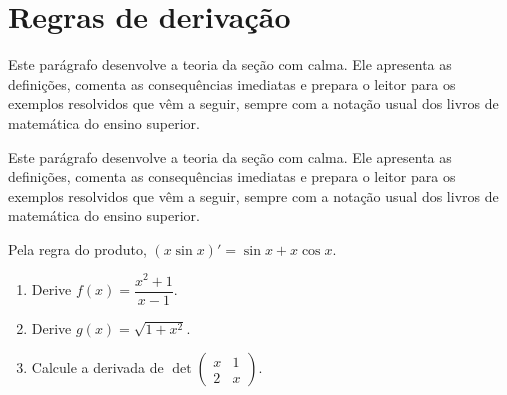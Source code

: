 \documentclass[11pt,oneside]{book}
\newcommand{\texto}{Este parágrafo desenvolve a teoria da seção com calma. Ele apresenta as
definições, comenta as consequências imediatas e prepara o leitor para os exemplos resolvidos
que vêm a seguir, sempre com a notação usual dos livros de matemática do ensino superior.\par}
\begin{document}
\section{Regras de derivação}
\texto\texto
\begin{exemplo}
Pela regra do produto, $(x \sin x)' = \sin x + x\cos x$.
\end{exemplo}
\blocoexercicios
\begin{enumerate}[label=\textbf{\arabic*.}]
\item Derive $f(x) = \dfrac{x^2 + 1}{x - 1}$.
\item Derive $g(x) = \sqrt{1 + x^2}$.
\item Calcule a derivada de $\det\begin{pmatrix} x & 1 \\ 2 & x \end{pmatrix}$.
\end{enumerate}
\end{document}
